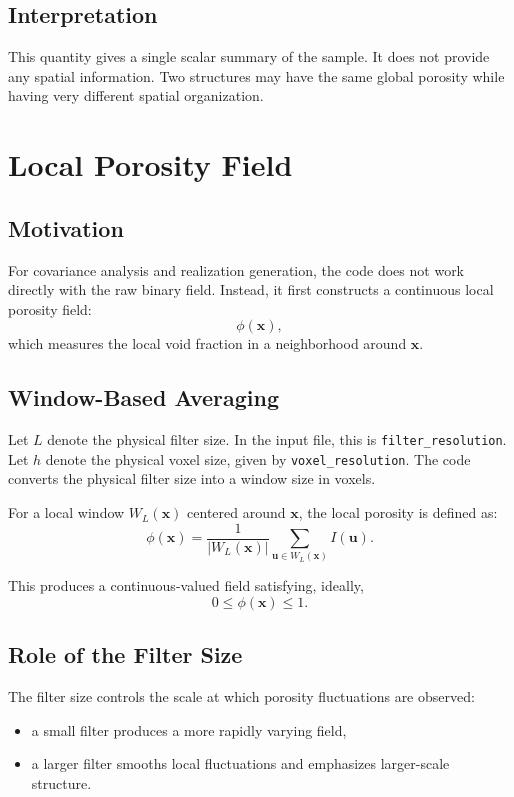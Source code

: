 \documentclass[11pt]{article}
\begin{document}
\subsection{Interpretation}
This quantity gives a single scalar summary of the sample. It does not provide
any spatial information. Two structures may have the same global porosity while
having very different spatial organization.

\section{Local Porosity Field}
\subsection{Motivation}
For covariance analysis and realization generation, the code does not work
directly with the raw binary field. Instead, it first constructs a continuous
local porosity field:
\[
\phi(\bm{x}),
\]
which measures the local void fraction in a neighborhood around \(\bm{x}\).

\subsection{Window-Based Averaging}
Let \(L\) denote the physical filter size. In the input file, this is
\texttt{filter\_resolution}. Let \(h\) denote the physical voxel size, given by
\texttt{voxel\_resolution}. The code converts the physical filter size into a
window size in voxels.

For a local window \(W_L(\bm{x})\) centered around \(\bm{x}\), the local
porosity is defined as:
\[
\phi(\bm{x})
=
\frac{1}{|W_L(\bm{x})|}
\sum_{\bm{u} \in W_L(\bm{x})} I(\bm{u}).
\]

This produces a continuous-valued field satisfying, ideally,
\[
0 \le \phi(\bm{x}) \le 1.
\]

\subsection{Role of the Filter Size}
The filter size controls the scale at which porosity fluctuations are observed:
\begin{itemize}
\item a small filter produces a more rapidly varying field,
\item a larger filter smooths local fluctuations and emphasizes larger-scale
structure.
\end{itemize}
\end{document}

